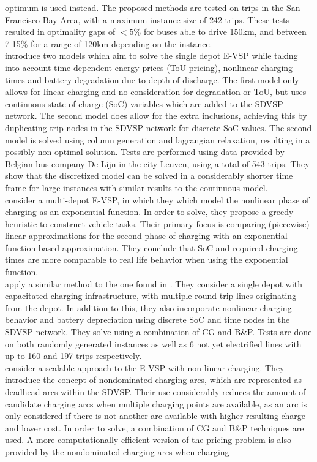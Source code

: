 \documentclass[]{article}
\begin{document}
optimum is used instead. The proposed methods are tested on trips in the San Francisco Bay
Area, with a maximum instance size of 242 trips. These tests resulted in
optimality gaps of $<5\%$ for buses able to drive 150km, and between 7-15\%
for a range of 120km depending on the instance. \\
 introduce two models which aim to solve the single depot E-VSP
while taking into account time dependent energy prices (ToU pricing), nonlinear charging times and
battery degradation due to depth of discharge. The first model only allows for linear charging and no consideration for degradation or ToU, but uses continuous state of charge (SoC) variables which are added to the SDVSP network. The second model does allow for the extra inclusions, achieving this by duplicating trip nodes in the SDVSP network for discrete SoC values. The second model is solved using column generation and lagrangian relaxation, resulting in a possibly non-optimal solution. Tests are performed using data provided by Belgian bus company De Lijn in the city Leuven, using a total of 543 trips. They show that the
discretized model can be solved in a considerably shorter time frame for large instances with similar results to
the continuous model. \\
\citet{Olsen2020} consider a multi-depot E-VSP, in which they which model the nonlinear phase of charging as an exponential function. In order to solve, they propose a greedy heuristic to construct vehicle tasks. Their primary focus is comparing (piecewise) linear approximations for the second phase of charging with an exponential function based approximation. They conclude that SoC and required charging times are more comparable to real life behavior when using the exponential function. \\
\citet{Zhang2021} apply a similar method to the one found in . They consider a single depot with capacitated charging infrastructure,
with multiple round trip lines originating from the depot. In addition to this, they also incorporate nonlinear charging behavior and battery depreciation using discrete SoC and time nodes in the SDVSP network. They solve using a combination of CG and B\&P. Tests are done on both randomly generated instances as well as 6 not yet electrified lines with up to 160 and 197 trips
respectively.\\
\citet{Parmentier2023} consider a scalable approach to the E-VSP with non-linear charging. They introduce the concept of nondominated charging arcs, which are represented as deadhead arcs within the SDVSP. Their use considerably reduces the amount of candidate charging arcs when multiple charging points are available, as an arc is only considered if there is not another arc available with higher resulting charge and lower cost. In order to solve, a combination of CG and B\&P techniques are used. A more computationally efficient version of the pricing problem is also provided by the nondominated charging arcs when charging
\end{document}
